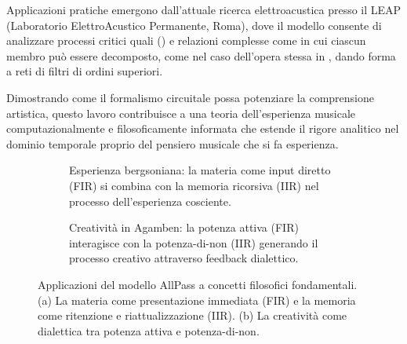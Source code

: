 Applicazioni pratiche emergono dall'attuale ricerca elettroacustica presso il LEAP (Laboratorio ElettroAcustico Permanente, Roma), dove il modello consente di analizzare processi critici quali  (\cite{diScipio2003}) e relazioni complesse come  in cui ciascun membro può essere decomposto, come nel caso dell'opera stessa in , dando forma a reti di filtri di ordini superiori.

Dimostrando come il formalismo circuitale possa potenziare la comprensione artistica, questo lavoro contribuisce a una teoria dell'esperienza musicale computazionalmente e filosoficamente informata che estende il rigore analitico nel dominio temporale proprio del pensiero musicale che si fa esperienza.

%






\begin{figure}[htbp]
  \centering
  \begin{subfigure}[b]{0.48\textwidth}
    \centering
    \caption{Esperienza bergsoniana: la materia come input diretto (FIR) si combina con la memoria ricorsiva (IIR) nel processo dell'esperienza cosciente.}
    \label{esperienza}
  \end{subfigure}
  \hfill
  \begin{subfigure}[b]{0.48\textwidth}
    \centering
    \caption{Creatività in Agamben: la potenza attiva (FIR) interagisce con la potenza-di-non (IIR) generando il processo creativo attraverso feedback dialettico.}
    \label{creativita}
  \end{subfigure}
  \caption{Applicazioni del modello AllPass a concetti filosofici fondamentali. (a) La materia come presentazione immediata (FIR) e la memoria come ritenzione e riattualizzazione (IIR). (b) La creatività come dialettica tra potenza attiva e potenza-di-non.}
  \label{fig:filosofia}
\end{figure}

